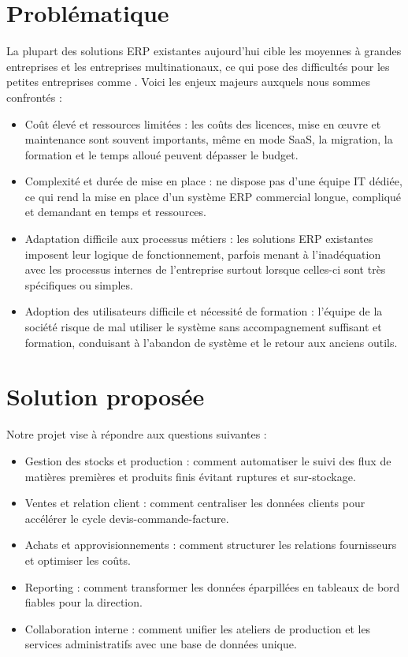 \section{Problématique}
La plupart des solutions ERP existantes aujourd’hui cible les moyennes à grandes entreprises et
les entreprises multinationaux, ce qui pose des difficultés pour les petites entreprises comme \reportEntreprise. Voici les enjeux majeurs auxquels nous sommes confrontés :
\begin{itemize}
    \item Coût élevé et ressources limitées : les coûts des licences, mise en œuvre et maintenance
sont souvent importants, même en mode SaaS, la migration, la formation et le temps
alloué peuvent dépasser le budget.
    \item Complexité et durée de mise en place : \reportEntreprise ne dispose pas d’une équipe IT dédiée,
ce qui rend la mise en place d'un système ERP commercial longue, compliqué et demandant en temps
et ressources.
    \item Adaptation difficile aux processus métiers : les solutions ERP existantes imposent leur logique de fonctionnement,
parfois menant à l’inadéquation avec les processus internes de l’entreprise \reportEntreprise surtout lorsque
celles-ci sont très spécifiques ou simples.
    \item Adoption des utilisateurs difficile et nécessité de formation : l'équipe de la société \reportEntreprise risque de mal utiliser
le système sans accompagnement suffisant et formation, conduisant à l’abandon de système et le retour aux
anciens outils.
\end{itemize}
\section{Solution proposée}
Notre projet vise à répondre aux questions suivantes :
\begin{itemize}
\item Gestion des stocks et production : comment automatiser le suivi des flux de matières premières et produits finis évitant ruptures et sur-stockage.
\item Ventes et relation client : comment centraliser les données clients pour accélérer le cycle devis-commande-facture.
\item Achats et approvisionnements : comment structurer les relations fournisseurs et optimiser les coûts.
\item Reporting : comment transformer les données éparpillées en tableaux de bord fiables pour la direction.
\item Collaboration interne : comment unifier les ateliers de production et les services administratifs avec une base de données unique.
\end{itemize}
